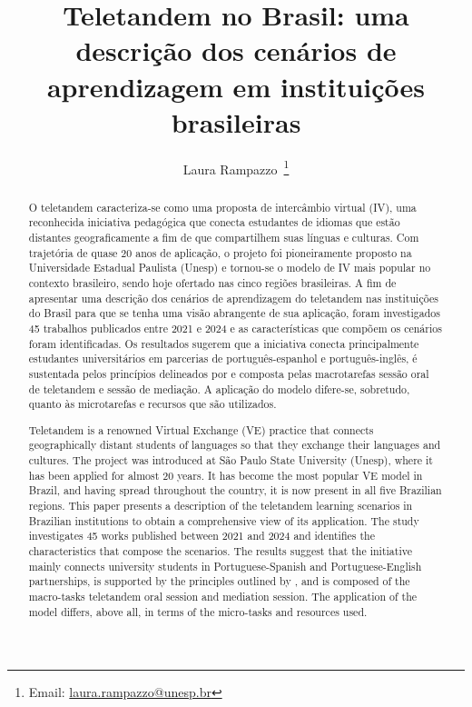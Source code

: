 \documentclass[portuguese]{textolivre}
\title{Teletandem no Brasil: uma descrição dos cenários de aprendizagem em instituições brasileiras}
\author[1]{Laura Rampazzo~\orcid{0000-0002-4736-9900}\thanks{Email: \href{mailto:laura.rampazzo@unesp.br}{laura.rampazzo@unesp.br}}}
\affil[1]{Universidade Estadual Paulista Júlio de Mesquita Filho (UNESP), São Paulo, SP, Brasil.}
\begin{document}
\maketitle
\begin{polyabstract}
\begin{abstract}
O teletandem caracteriza-se como uma proposta de intercâmbio virtual (IV), uma reconhecida iniciativa pedagógica que conecta estudantes de idiomas que estão distantes geograficamente a fim de que compartilhem suas línguas e culturas. Com trajetória de quase 20 anos de aplicação, o projeto foi pioneiramente proposto na Universidade Estadual Paulista (Unesp) e tornou-se o modelo de IV mais popular no contexto brasileiro, sendo hoje ofertado nas cinco regiões brasileiras. A fim de apresentar uma descrição dos cenários de aprendizagem do teletandem nas instituições do Brasil para que se tenha uma visão abrangente de sua aplicação, foram investigados 45 trabalhos publicados entre 2021 e 2024 e as características que compõem os cenários foram identificadas. Os resultados sugerem que a iniciativa conecta principalmente estudantes universitários em parcerias de português-espanhol e português-inglês, é sustentada pelos princípios delineados por \textcite{vassallo2006} e composta pelas macrotarefas sessão oral de teletandem e sessão de mediação. A aplicação do modelo difere-se, sobretudo, quanto às microtarefas e recursos que são utilizados.

\end{abstract}

\begin{english}
\begin{abstract}
Teletandem is a renowned Virtual Exchange (VE) practice that connects geographically distant students of languages so that they exchange their languages and cultures. The project was introduced at São Paulo State University (Unesp), where it has been applied for almost 20 years. It has become the most popular VE model in Brazil, and having spread throughout the country, it is now present in all five Brazilian regions. This paper presents a description of the teletandem learning scenarios in Brazilian institutions to obtain a comprehensive view of its application. The study investigates 45 works published between 2021 and 2024 and identifies the characteristics that compose the scenarios. The results suggest that the initiative mainly connects university students in Portuguese-Spanish and Portuguese-English partnerships, is supported by the principles outlined by \textcite{vassallo2006}, and is composed of the macro-tasks teletandem oral session and mediation session. The application of the model differs, above all, in terms of the micro-tasks and resources used.

\end{abstract}
\end{english}
\end{polyabstract}
\end{document}
